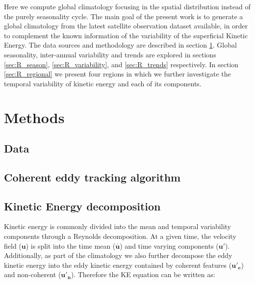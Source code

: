 \documentclass[draft,linenumbers]{agujournal2019}
\begin{document}
Here we compute global climatology focusing in the spatial distribution instead of the purely seasonality cycle.  
The main goal of the present work is to generate a global climatology from the latest satellite observation dataset available, in order to complement the known information of the variability of the superficial Kinetic Energy. The data sources and methodology are described in section \ref{sec:Methods}. Global seasonality, inter-annual variability and trends are explored in sections \ref{sec:R_season},  \ref{sec:R_variability}, and  \ref{sec:R_trends} respectively. In section \ref{sec:R_regional} we present four regions in which we further investigate the temporal variability of kinetic energy and each of its components.

\section{Methods}
\label{sec:Methods}
	\subsection{Data}
	


	\subsection{Coherent eddy tracking algorithm}




	\subsection{Kinetic Energy decomposition}

	Kinetic energy is commonly divided into the mean and temporal variability components through a Reynolds decomposition. At a given time, the velocity field ($\mathbf{u}$) is split into the time mean ($\mathbf{\overline{u}}$) and time varying components ($\mathbf{u'}$). Additionally, as part of the climatology we also further decompose the eddy kinetic energy into the eddy kinetic energy contained by coherent features ($\mathbf{u'_e}$) and non-coherent ($\mathbf{u'_n}$). Therefore the KE equation can be written as:
	
\end{document}
